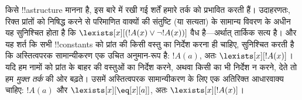 \documentclass[../../../include/open-logic-section]{subfiles}
\begin{document}
\begin{digress}
किसे !!a{structure} मानना है, इस बारे में रखी गई शर्तें हमारे तर्क को
प्रभावित करती हैं। उदाहरणतः, रिक्त प्रांतों को निषिद्ध करने से परिमाणित
वाक्यों की संतुष्टि (या सत्यता) के सामान्य विवरण के अधीन यह सुनिश्चित होता
है कि $\lexists[x][(!A(x) \lor \lnot !A(x))]$ वैध है---अर्थात् तार्किक सत्य
है। और यह शर्त कि सभी !!{constant}s को प्रांत की किसी वस्तु का निर्देश करना
ही चाहिए, सुनिश्चित करती है कि अस्तित्वपरक सामान्यीकरण एक उचित अनुमान-रूप
है: $!A(a)$, अतः $\lexists[x][!A(x)]$। यदि हम नामों को प्रांत के बाहर की
वस्तुओं का निर्देश करने, अथवा किसी का भी निर्देश न करने, देते तो हम
\emph{मुक्त तर्क} की ओर बढ़ते। उसमें अस्तित्वपरक सामान्यीकरण के लिए एक
अतिरिक्त आधारवाक्य चाहिए: $!A(a)$ और $\lexists[x][\eq[x][a]]$, अतः
$\lexists[x][!A(x)]$।
\end{digress}
\end{document}
